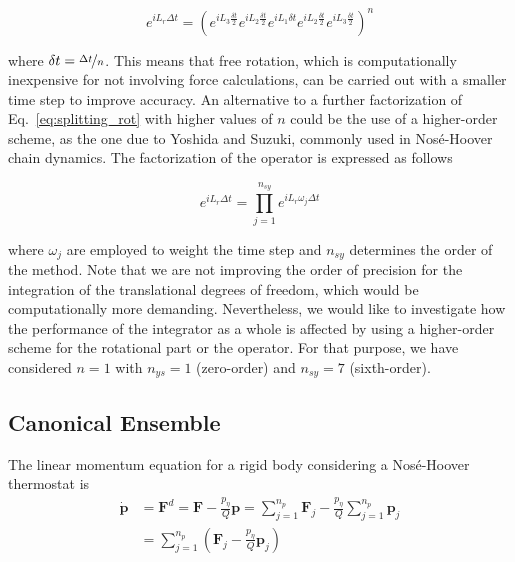\documentclass[aip,jcp,reprint,amsmath,amssymb]{revtex4-1}
\newcommand{\vt}[1]{\boldsymbol{\mathbf{#1}}}           %
\begin{document}
\begin{equation}
\label{eq:splitting_rot}
e^{i L_r \Delta t} = \left( e^{i L_3 \frac{\delta t}{2}} e^{i L_2 \frac{\delta t}{2}} e^{i L_1 \delta t} e^{i L_2 \frac{\delta t}{2}} e^{i L_3 \frac{\delta t}{2}} \right)^n
\end{equation}

where $\delta t = \nicefrac{\Delta t}{n}$. This means that free rotation, which is computationally inexpensive for not involving force calculations, can be carried out with a smaller time step to improve accuracy. An alternative to a further factorization of Eq.~\ref{eq:splitting_rot} with higher values of $n$ could be the use of a higher-order scheme, as the one due to Yoshida \cite{Yoshida1990} and Suzuki\cite{Suzuki1991a,Suzuki1991b}, commonly used in Nos\'{e}-Hoover chain dynamics. 
The factorization of the operator is expressed as follows 
 
\begin{equation}
\label{eq:ys_rot}
e^{i L_{r} \Delta t} = \prod_{j=1}^{n_{sy}} e^{i L_{r} \omega_j \Delta t}
\end{equation}

where $\omega_j$ are employed to weight the time step and $n_{sy}$ determines the order of the method. Note that we are not improving the order of precision for the integration of the translational degrees of freedom, which would be computationally more demanding. Nevertheless, we would like to investigate   how the performance of the integrator as a whole is affected by using a higher-order scheme for the rotational part or the operator. For that purpose, we have considered $n = 1$ with $n_{ys} = 1 $ (zero-order) and $n_{sy} = 7$ (sixth-order).

\subsection{Canonical Ensemble}
\label{sec:canonical}
The linear momentum equation for a rigid body considering a Nos\'{e}-Hoover thermostat is
\begin{align*}
\dot{\vt p} &= \vt F^d = {\vt F} - \frac{p_{\eta}}{Q} {\vt p} = \sum_{j=1}^{n_p} {\vt F}_j - \frac{p_{\eta}}{Q} \sum_{j=1}^{n_p} {\vt p}_j \\
&= \sum_{j=1}^{n_p} \left( {\vt F}_j - \frac{p_{\eta}}{Q} {\vt p}_j \right)
\end{align*}
\end{document}

